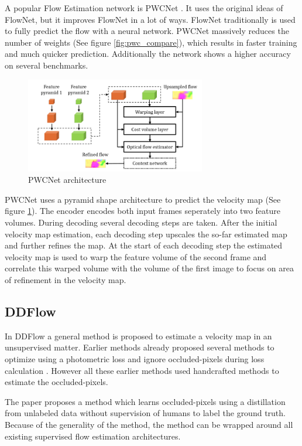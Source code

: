 A popular Flow Estimation network is PWCNet \cite{sun_pwc-net_2018}. It uses the original ideas of FlowNet, but it improves FlowNet in a lot of ways. FlowNet traditionally is used to fully predict the flow with a neural network. PWCNet massively reduces the number of weights (See figure \ref{fig:pwc_compare}), which results in faster training and much quicker prediction. Additionally the network shows a higher accuracy on several benchmarks.

\begin{figure}[h]
\centering
\includegraphics[width=0.7\textwidth]{images/pwcnet_approach}
\caption{PWCNet architecture}
\label{fig:pwc_approach}
\end{figure}

PWCNet uses a pyramid shape architecture to predict the velocity map (See figure \ref{fig:pwc_approach}). The encoder encodes both input frames seperately into two feature volumes. During decoding several decoding steps are taken. After the initial velocity map estimation, each decoding step upscales the so-far estimated map and further refines the map. At the start of each decoding step the estimated velocity map is used to warp the feature volume of the second frame and correlate this warped volume with the volume of the first image to focus on area of refinement in the velocity map.

\subsection{DDFlow}
In DDFlow \cite{liu_ddflow_2019} a general method is proposed to estimate a velocity map in an unsupervised matter. Earlier methods already proposed several methods to optimize using a photometric loss \cite{Yu2016} and ignore occluded-pixels during loss calculation \cite{Janai2018}. However all these earlier methods used handcrafted methods to estimate the occluded-pixels.

The paper \cite{liu_ddflow_2019} proposes a method which learns occluded-pixels using a distillation from unlabeled data without supervision of humans to label the ground truth. Because of the generality of the method, the method can be wrapped around all existing supervised flow estimation architectures.

